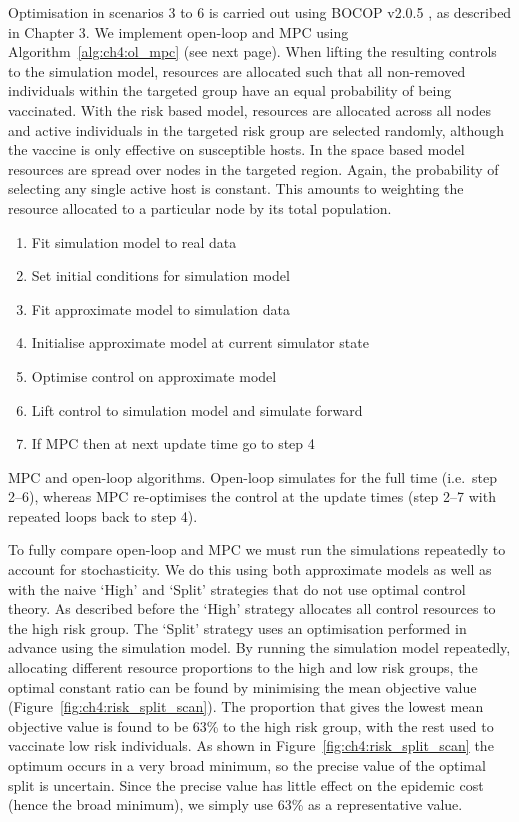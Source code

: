 Optimisation in scenarios 3 to 6 is carried out using BOCOP v2.0.5 \citep{bocop}, as described in Chapter 3. We implement open-loop and MPC using Algorithm~\ref{alg:ch4:ol_mpc} (see next page). When lifting the resulting controls to the simulation model, resources are allocated such that all non-removed individuals within the targeted group have an equal probability of being vaccinated. With the risk based model, resources are allocated across all nodes and active individuals in the targeted risk group are selected randomly, although the vaccine is only effective on susceptible hosts. In the space based model resources are spread over nodes in the targeted region. Again, the probability of selecting any single active host is constant. This amounts to weighting the resource allocated to a particular node by its total population.
 
\begin{algorithm}
    \begin{enumerate}
        \item{}Fit simulation model to real data
        \item{}Set initial conditions for simulation model
        \item{}Fit approximate model to simulation data
        \item{}Initialise approximate model at current simulator state
        \item{}Optimise control on approximate model
        \item{}Lift control to simulation model and simulate forward
        \item{}If MPC then at next update time go to step 4
    \end{enumerate}
\caption{MPC and open-loop algorithms. Open-loop simulates for the full time (i.e.\ step 2--6), whereas MPC re-optimises the control at the update times (step 2--7 with repeated loops back to step 4).\label{alg:ch4:ol_mpc}}
\end{algorithm}

To fully compare open-loop and MPC we must run the simulations repeatedly to account for stochasticity. We do this using both approximate models as well as with the naive `High' and `Split' strategies that do not use optimal control theory. As described before the `High' strategy allocates all control resources to the high risk group. The `Split' strategy uses an optimisation performed in advance using the simulation model. By running the simulation model repeatedly, allocating different resource proportions to the high and low risk groups, the optimal constant ratio can be found by minimising the mean objective value (Figure~\ref{fig:ch4:risk_split_scan}). The proportion that gives the lowest mean objective value is found to be 63\% to the high risk group, with the rest used to vaccinate low risk individuals. As shown in Figure~\ref{fig:ch4:risk_split_scan} the optimum occurs in a very broad minimum, so the precise value of the optimal split is uncertain. Since the precise value has little effect on the epidemic cost (hence the broad minimum), we simply use 63\% as a representative value.

